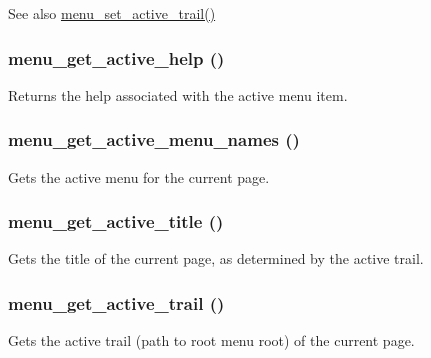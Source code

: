 \begin{DoxySeeAlso}{See also}
\hyperlink{group__menu_ga9328a9a4f297d8bb095d924e75a8abd7}{menu\_\-set\_\-active\_\-trail()} 
\end{DoxySeeAlso}
\hypertarget{group__menu_ga21c6572391132f4e1f5b3fd108220bf4}{
\subsubsection[{menu\_\-get\_\-active\_\-help}]{\setlength{\rightskip}{0pt plus 5cm}menu\_\-get\_\-active\_\-help ()}}
\label{group__menu_ga21c6572391132f4e1f5b3fd108220bf4}
Returns the help associated with the active menu item. \hypertarget{group__menu_ga421798c040a98ec1b5d583e7a7a5e65b}{
\subsubsection[{menu\_\-get\_\-active\_\-menu\_\-names}]{\setlength{\rightskip}{0pt plus 5cm}menu\_\-get\_\-active\_\-menu\_\-names ()}}
\label{group__menu_ga421798c040a98ec1b5d583e7a7a5e65b}
Gets the active menu for the current page. \hypertarget{group__menu_gaf0a358447097959e53ad1a20b8d811ed}{
\subsubsection[{menu\_\-get\_\-active\_\-title}]{\setlength{\rightskip}{0pt plus 5cm}menu\_\-get\_\-active\_\-title ()}}
\label{group__menu_gaf0a358447097959e53ad1a20b8d811ed}
Gets the title of the current page, as determined by the active trail. \hypertarget{group__menu_ga55105d602c5c5ea5b39aae25aa47f8c5}{
\subsubsection[{menu\_\-get\_\-active\_\-trail}]{\setlength{\rightskip}{0pt plus 5cm}menu\_\-get\_\-active\_\-trail ()}}
\label{group__menu_ga55105d602c5c5ea5b39aae25aa47f8c5}
Gets the active trail (path to root menu root) of the current page.


